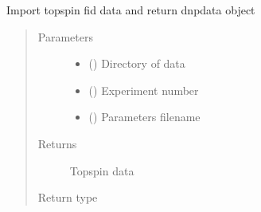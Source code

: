 \documentclass[letterpaper,10pt,english]{sphinxmanual}
\begin{document}
\begin{fulllineitems}
\label{\detokenize{dnpImport:dnpLab.dnpImport.topspin.topspin_fid}}
Import topspin fid data and return dnpdata object
\begin{quote}\begin{description}
\item[{Parameters}] \leavevmode\begin{itemize}
\item {} 
 () \sphinxhyphen{}\sphinxhyphen{} Directory of data

\item {} 
 () \sphinxhyphen{}\sphinxhyphen{} Experiment number

\item {} 
 () \sphinxhyphen{}\sphinxhyphen{} Parameters filename

\end{itemize}

\item[{Returns}] \leavevmode
Topspin data

\item[{Return type}] \leavevmode
{\hyperref[\detokenize{dnpData:dnpLab.dnpdata}]{}}

\end{description}\end{quote}

\end{fulllineitems}

\end{document}
